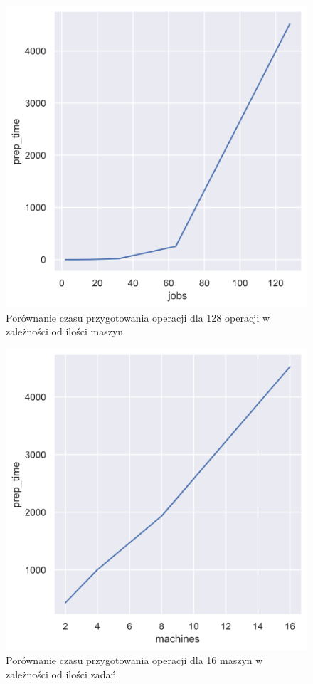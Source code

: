 \documentclass[brudnopis]{xmgr}
\begin{document}
\begin{figure}[!tbh]
\centering
\includegraphics[width=.8\hsize]{fig/relplot_128j.png}
\caption{Porównanie czasu przygotowania operacji dla 128 operacji w zależności od ilości maszyn\label{diag:relplot_128j}}
\end{figure}\medskip

\begin{figure}[!tbh]
\centering
\includegraphics[width=.8\hsize]{fig/relplot_16m.png}
\caption{Porównanie czasu przygotowania operacji dla 16 maszyn w zależności od ilości zadań\label{diag:relplot_16m}}
\end{figure}\medskip
\end{document}

